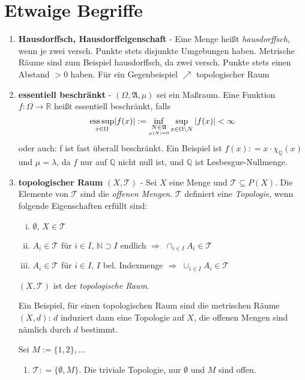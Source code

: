\documentclass[ngerman]{report}
\theoremstyle{plain}%
\theoremstyle{definition}%
\theoremstyle{myStyle}
\newcommand{\R}{\mathbb{R}}
\newcommand{\Q}{\mathbb{Q}}
\newcommand{\N}{\mathbb{N}}
\newcommand{\hA}{\mathfrak{A}}%
\newcommand{\tT}{\mathcal{T}} %
\newcommand{\ess}{\textnormal{ess}}
\newcommand{\df}[1][]{%
	\overset{#1}{\Rightarrow}
}
\begin{document}

\section*{Etwaige Begriffe}
	\begin{enumerate}
		\item \textbf{Hausdorffsch, Hausdorffeigenschaft} - Eine Menge heißt \textit{hausdorffsch}, wenn je zwei versch. Punkte stets disjunkte Umgebungen haben. Metrische Räume sind zum Beispiel hausdorffsch, da zwei versch. Punkte stets einen Abstand $> 0$ haben. Für ein Gegenbeispiel $\nearrow$ topologischer Raum

		\item \textbf{essentiell beschränkt} - 
					$(\Omega, \hA,\mu)$ sei ein Maßraum. Eine Funktion $f: \Omega \rightarrow \R$ heißt essentiell beschränkt, falls 
					$$\underset{x\in\Omega}{\ess \sup} |f(x)| := {\inf_{\underset{\mu(N)=0}{N \in \hA}} }  
					\sup_{x\in \Omega\backslash N} |f(x)| < \infty$$
					oder auch: f ist fast überall beschränkt. 
					Ein Beispiel ist $f(x) : = x\cdot \chi_\Q(x)$ und $\mu = \lambda$, da $f$ nur auf $\Q$ nicht null ist, und $\Q$ ist Lesbesgue-Nullmenge. 

		\item \textbf{topologischer Raum} $(X,\tT)$ - Sei $X$ eine Menge und $\tT\subseteq P(X)$. Die Elemente von $\tT$ sind die \textit{offenen Mengen}. $\tT$ definiert eine \textit{Topologie}, wenn folgende Eigenschaften erfüllt sind:
	\begin{enumerate}[(i)]
	\item $\emptyset,\,X\in \tT$

\item $A_i\in\tT$ für $i\in I$, $\N \supset I$ endlich $\df$ $\cap_{i\in I} A_i\in\tT$

\item $A_i\in\tT$ für $i\in I$, $I$ bel. Indexmenge $\df$ $\cup_{i\in I}A_i \in \tT$
\end{enumerate}
	$(X,\tT)$ ist der \textit{topologische Raum}.\par
Ein Beispiel, für einen topologischen Raum sind die metrischen Räume $(X,d)$: $d$ induziert dann eine Topologie auf $X$, die offenen Mengen sind nämlich durch $d$ bestimmt.\par
Sei $M:=\{1,2\},\dots$
\begin{enumerate}[]
\item $\tT: = \{\emptyset,M\}$. Die triviale Topologie, nur $\emptyset$ und $M$ sind offen.


\end{enumerate}
\end{enumerate}
\end{document}
